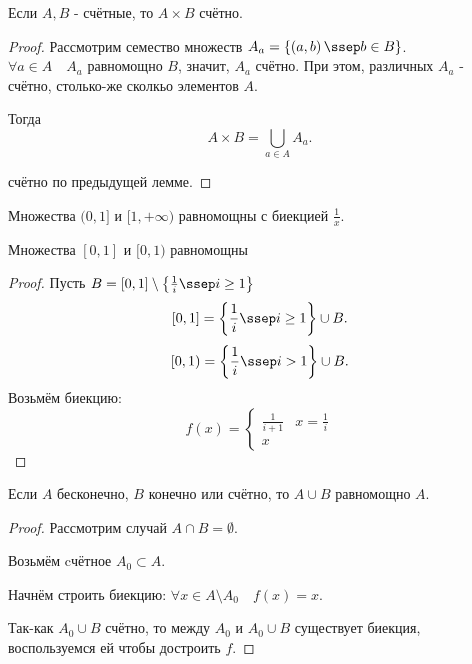 \begin{theorem} \thmslashn

    Если $A, B$ - счётные, то $A \times B$ счётно.
    \begin{proof} \thmslashn
    
        Рассмотрим семество множеств  $A_{a} = \{\left( a, b \right) \ssep b\in B\}$. $\forall{a\in A}\quad A_{a} \text{ равномощно } B$, значит, $A_{a}$ счётно. При этом, различных $A_{a}$ - счётно, столько-же сколкьо элементов $A$.

        Тогда
        \[ A \times B = \bigcup_{a\in A} A_{a}  .\]
        
        счётно по предыдущей лемме.
    \end{proof}
\end{theorem}
\begin{statement} \thmslashn

    Множества $(0, 1]$ и $[1, +\infty)$ равномощны с биекцией $\frac{1}{x}$.

    Множества $[0, 1]$ и $[0, 1)$ равномощны
    \begin{proof} \thmslashn
    
        Пусть $B = [0, 1] \setminus \left\{\frac{1}{i} \ssep i \ge 1\right\} $
        \[[0, 1] = \left\{\frac{1}{i} \ssep i \ge 1\right\} \cup B.\]
        \[ [0, 1) = \left\{\frac{1}{i} \ssep i > 1\right\} \cup B  .\] 
        Возьмём биекцию:
        \begin{equation*}
            f(x) = \begin{cases}
                \frac{1}{i + 1} & x = \frac{1}{i}\\
                x
            \end{cases}
        \end{equation*}
    \end{proof}
\end{statement}
\begin{theorem} \thmslashn

    Если $A$ бесконечно, $B$ конечно или счётно, то $A \cup B$ равномощно $A$.
    \begin{proof} \thmslashn
    
        Рассмотрим случай $A\cap B = \emptyset$.

        Возьмём cчётное $A_0 \subset A$.

        Начнём строить биекцию: $\forall{x \in A \setminus A_0}\quad f(x) = x$.

        Так-как $A_0 \cup B$ счётно, то между $A_0$ и $A_0 \cup B$ существует биекция, воспользуемся ей чтобы достроить $f$.
    \end{proof}
\end{theorem}
